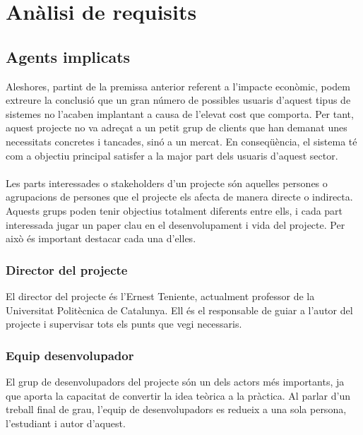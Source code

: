 
\chapter{Anàlisi de requisits} %

\label{Chapter4} %


\section{Agents implicats}

Aleshores, partint de la premissa anterior referent a l’impacte econòmic, podem extreure la conclusió que un gran número de possibles usuaris d’aquest tipus de sistemes no l’acaben implantant a causa de l’elevat cost que comporta. Per tant, aquest projecte no va adreçat a un petit grup de clients que han demanat unes necessitats concretes i tancades, sinó a un mercat. En conseqüència, el sistema té com a objectiu principal satisfer a la major part dels usuaris d’aquest sector.
\\\\
Les parts interessades o stakeholders\cite{stakeholder} d’un projecte són aquelles persones o agrupacions de persones que el projecte els afecta de manera directe o indirecta. Aquests grups poden tenir objectius totalment diferents entre ells, i cada part interessada jugar un paper clau en el desenvolupament i vida del projecte. Per això és important destacar cada una d’elles.

\subsection{Director del projecte}
El director del projecte és l’Ernest Teniente\cite{ernestteniente}, actualment professor de la Universitat Politècnica de Catalunya. Ell és el responsable de guiar a l’autor del projecte i supervisar tots els punts que vegi necessaris.

\subsection{Equip desenvolupador}
El grup de desenvolupadors del projecte són un dels actors més importants, ja que aporta la capacitat de convertir la idea teòrica a la pràctica. Al parlar d’un treball final de grau, l’equip de desenvolupadors es redueix a una sola persona, l’estudiant i autor d’aquest.

